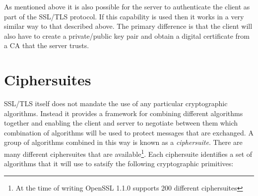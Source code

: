 As mentioned above it is also possible for the server to authenticate the 
client as part of the SSL/TLS protocol. If this capability is used then it works
in a very similar way  to that described above. The primary difference is that
the client will also have to create a private/public key pair and obtain a
digital certificate from a CA that the server trusts. 

\section{Ciphersuites}

SSL/TLS itself does not mandate the use of any particular cryptographic 
algorithms. Instead it provides a framework for combining different algorithms 
together and enabling the client and server to negotiate between them which 
combination of algorithms will be used to protect messages that are exchanged. 
A group of algorithms combined in this way is known as a \emph{ciphersuite}. 
There are many different ciphersuites that are available\footnote{At the time 
of writing OpenSSL 1.1.0 supports 200 different ciphersuites}. Each 
ciphersuite identifies a set of algorithms that it will use to satsify the 
following cryptographic primitives:
